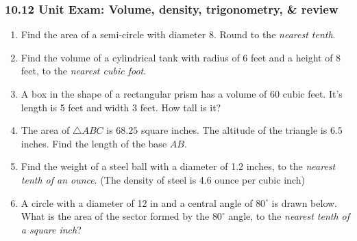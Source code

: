 \documentclass[12pt, twoside]{article}
\begin{document}
\subsubsection*{10.12 Unit Exam: Volume, density, trigonometry, \& review}
 \begin{enumerate}

  \item Find the area of a semi-circle with diameter 8. Round to the \emph{nearest tenth}.\vspace{3cm}

  \item Find the volume of a cylindrical tank with radius of $6$ feet and a height of 8 feet, to the \emph{nearest cubic foot}. \vspace{2.5cm}

  \item A box in the shape of a rectangular prism has a volume of 60 cubic feet. It's length is 5 feet and width 3 feet. How tall is it? \vspace{3.0cm}

  \item The area of $\triangle ABC$ is $68.25$ square inches. The altitude of the triangle is $6.5$ inches. Find the length of the base $AB$.\\[0.5cm]
   \vspace{0.25cm}

  \item Find the weight of a steel ball with a diameter of 1.2 inches, to the \emph{nearest tenth of an ounce}. (The density of steel is 4.6 ounce per cubic inch)

\newpage

  \item A circle with a diameter of 12 in and a central angle of $80^\circ$ is drawn below. What is the area of the sector formed by the $80^\circ$ angle, to the \emph{nearest tenth of a square inch}?\\[0.25cm]
   \vspace{0.5cm}


\end{enumerate}
\end{document}
